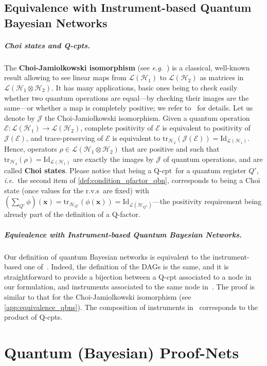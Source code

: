 \documentclass[10pt,a4paper]{article}
\newcommand*{\ie}{\emph{i.e.}\xspace}
\newcommand*{\eg}{\emph{e.g.}\xspace}
\newcommand*{\definitive}[1]{\textbf{#1}}
\newcommand{\bx}{{\mathbf x}}
\newcommand{\ptr}[1]{\mathrm{tr}_{#1}}
\renewcommand{\L}{\mathcal{L}}
\newcommand{\Eop}{\mathcal E}
\newcommand{\HH}{\mathcal{H}}
\newcommand{\M}{\rho}
\newcommand{\reg}{Q}
\newcommand{\qreg}{\reg}
\newcommand*{\someqfact}{\phi}
\newcommand*{\id}[1][]{\mathrm{Id}_{#1}}
\newcommand*{\choiiso}{\mathcal{J}}
\newcommand{\rvs}{r.v.s\xspace}
\newcommand*{\qfactor}{Q-factor}
\newcommand*{\Qfactor}{\qfactor}
\newcommand*{\qCPT}{Q-\textsf{cpt}\xspace}
\newcommand*{\qCPTs}{Q-\textsf{cpt}s\xspace}
\begin{document}
\subsection{Equivalence with Instrument-based Quantum Bayesian Networks}
\label{sec:choi_iso}

\subparagraph{Choi states and \qCPTs.}

The \definitive{Choi-Jamiolkowski isomorphism} (see \eg~\cite{Watrous_book}) is a classical, well-known result allowing to see linear maps from $\L(\HH_1)$ to $\L(\HH_2)$ as matrices in $\L(\HH_1 \otimes \HH_2)$.
It has many applications, basic ones being to check easily whether two quantum operations are equal---by checking their images are the same---or whether a map is completely positive; we refer to~\cite{Watrous_book} for details.
Let us denote by $\choiiso$ the Choi-Jamiolkowski isomorphism.
Given a quantum operation $\Eop : \L(\HH_1) \to \L(\HH_2)$, complete positivity of $\Eop$ is equivalent to positivity of $\choiiso(\Eop)$, and trace-preserving of $\Eop$ is equivalent to $\ptr{\HH_2}(\choiiso(\Eop)) = \id[\L(\HH_1)]$.
Hence, operators $\M\in\L(\HH_1 \otimes \HH_2)$ that are positive and such that $\ptr{\HH_2}(\M) = \id[\L(\HH_1)]$ are exactly the images by $\choiiso$ of quantum operations, and are called \definitive{Choi states}.
Please notice that being a \qCPT\ for a quantum register $Q'$, \ie\ the second item of \cref{def:condition_qfactor_qbn}, corresponds to being a Choi state (once values for the \rvs\ are fixed) with $\left(\sum_{\qreg'} \someqfact\right)(\bx) = \ptr{\HH_{\qreg'}}(\someqfact(\bx)) = \id[\L(\HH_{\qreg''})]$---the positivity requirement being already part of the definition of a \Qfactor.

\subparagraph{Equivalence with Instrument-based Quantum Bayesian Networks.}

Our definition of %
quantum Bayesian networks is equivalent to the instrument-based one of~\cite{GBN2014}.
Indeed, the definition of the DAGs is the same, and it is straightforward to provide a bijection between a \qCPT associated to a node in our formulation, and instruments associated to the same node in~\cite{GBN2014}.
The proof is similar to that for the Choi-Jamiolkowski isomorphism (see \cref{app:equivalence_qbns}).
The composition of instruments in~\cite{GBN2014} corresponds to the product of \qCPTs.


\section{Quantum (Bayesian) Proof-Nets}
\label{sec:qpns}
\end{document}
